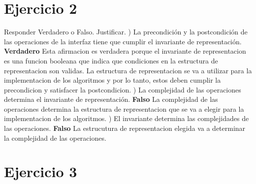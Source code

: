 \documentclass[10pt,a4paper]{article}
\begin{document}
\section{Ejercicio 2}

Responder Verdadero o Falso. Justificar.
\newline
{}) La precondición y la postcondición de las operaciones de la interfaz tiene que cumplir el invariante de representación. \textbf{Verdadero}
\newline
\newline
Esta afirmacion es verdadera porque el invariante de representacion es una funcion booleana que indica que condiciones en la estructura de representacion son validas. La estructura de representacion se va a utilizar para la implementacion de los algoritmos y por lo tanto, estos deben cumplir la precondicion y satisfacer la postcondicion.
\newline
{}) La complejidad de las operaciones determina el invariante de representación. \textbf{Falso}
\newline
\newline
La complejidad de las operaciones determina la estructura de representacion que se va a elegir para la implementacion de los algoritmos.
\newline
{}) El invariante determina las complejidades de las operaciones. \textbf{Falso}
\newline
\newline
La estrucutura de representacion elegida va a determinar la complejidad de las operaciones. 
\newpage

\section{Ejercicio 3}
\end{document}
